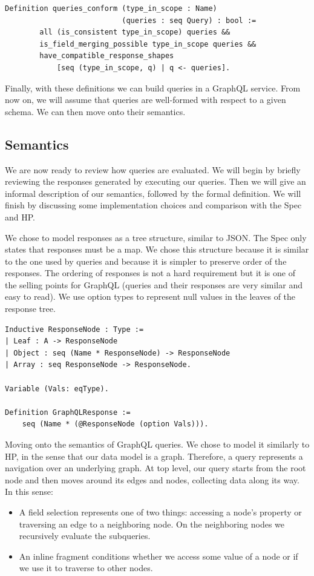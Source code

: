 \begin{verbatim}
Definition queries_conform (type_in_scope : Name) 
                           (queries : seq Query) : bool :=
        all (is_consistent type_in_scope) queries &&
        is_field_merging_possible type_in_scope queries &&
        have_compatible_response_shapes 
            [seq (type_in_scope, q) | q <- queries].
\end{verbatim}

Finally, with these definitions we can build queries in a GraphQL service. From now on, we will assume that queries are well-formed with respect to a given schema. We can then move onto their semantics.

\subsection{Semantics}\label{subsec:semantics}

We are now ready to review how queries are evaluated. We will begin by briefly reviewing the responses generated by executing our queries. Then we will give an informal description of our semantics, followed by the formal definition. We will finish by discussing some implementation choices and comparison with the Spec and HP.

We chose to model responses as a tree structure, similar to JSON. The Spec only states that responses must be a map. We chose this structure because it is similar to the one used by queries and because it is simpler to preserve order of the responses. The ordering of responses is not a hard requirement but it is one of the selling points for GraphQL (queries and their responses are very similar and easy to read). We use option types to represent null values in the leaves of the response tree.

\begin{verbatim}
Inductive ResponseNode : Type :=
| Leaf : A -> ResponseNode
| Object : seq (Name * ResponseNode) -> ResponseNode
| Array : seq ResponseNode -> ResponseNode.

Variable (Vals: eqType).

Definition GraphQLResponse := 
    seq (Name * (@ResponseNode (option Vals))).
\end{verbatim}

Moving onto the semantics of GraphQL queries. We chose to model it similarly to HP, in the sense that our data model is a graph. Therefore, a query represents a navigation over an underlying graph. At top level, our query starts from the root node and then moves around its edges and nodes, collecting data along its way. In this sense:
\begin{itemize}
    \item A field selection represents one of two things: accessing a node's property or traversing an edge to a neighboring node. On the neighboring nodes we recursively evaluate the subqueries.
    \item An inline fragment conditions whether we access some value of a node or if we use it to traverse to other nodes.
\end{itemize}

